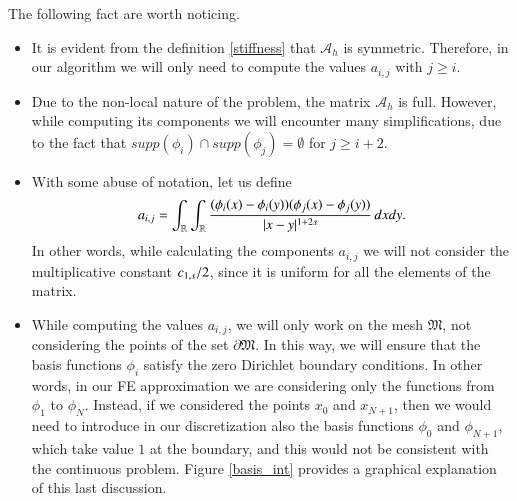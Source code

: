 \begin{remark}\label{rem_prel}
The following fact are worth noticing.
\begin{itemize}
	\item It is evident from the definition \eqref{stiffness} that $\mathcal A_h$ is symmetric. Therefore, in our algorithm we will only need to compute the values $a_{i,j}$ with $j\geq i$.
	
	\item Due to the non-local nature of the problem, the matrix $\mathcal A_h$ is full. However, while computing its components we will encounter many simplifications, due to the fact that $supp(\phi_i)\cap supp(\phi_j) =\emptyset$ for $j\geq i+2$.
	
	\item With some abuse of notation, let us define 
	\begin{align}\label{stiffness_nc}
	a_{i,j}= \int_{\mathbb{R}}\int_{\mathbb{R}}\frac{(\phi_i(x)-\phi_i(y))(\phi_j(x)-\phi_j(y))}{|x-y|^{1+2s}}\,dxdy.
\end{align}
	In other words, while calculating the components $a_{i,j}$ we will not consider the multiplicative constant $c_{1,s}/2$, since it is uniform for all the elements of the matrix. 
	
	\item While computing the values $a_{i,j}$, we will only work on the mesh $\mathfrak{M}$, not considering the points of the set $\partial\mathfrak{M}$. In this way, we will ensure that the basis functions $\phi_i$ satisfy the zero Dirichlet boundary conditions. In other words, in our FE approximation we are considering only the functions from $\phi_1$ to $\phi_N$. Instead, if we considered the points $x_0$ and $x_{N+1}$, then we would need to introduce in our discretization also the basis functions $\phi_0$ and $\phi_{N+1}$, which take value $1$ at the boundary, and this would not be consistent with the continuous problem. Figure \ref{basis_int} provides a graphical explanation of this last discussion.      	
\end{itemize}
\end{remark}

